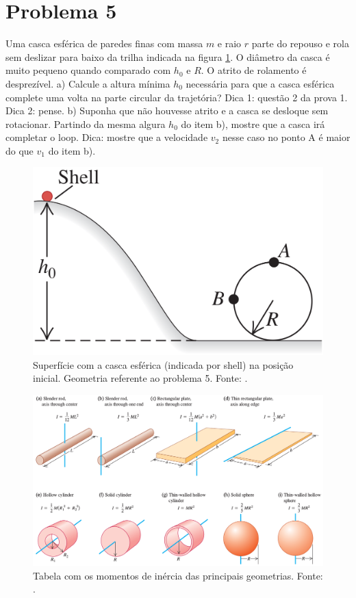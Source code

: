 \documentclass[a4paper, 11pt]{article}
\begin{document}
\section*{Problema 5}
Uma casca esférica de paredes finas com massa $m$ e raio $r$ parte do repouso e rola sem deslizar para baixo da trilha indicada na figura \ref{casca_prob}. O diâmetro da casca é muito pequeno quando comparado com $h_0$ e $R$. O atrito de rolamento é desprezível. a) Calcule a altura mínima $h_0$ necessária para que a casca esférica complete uma volta na parte circular da trajetória? Dica 1: questão 2 da prova 1. Dica 2: pense. b) Suponha que não houvesse atrito e a casca se desloque sem rotacionar. Partindo da mesma algura $h_0$ do item b), mostre que a casca irá completar o loop. Dica: mostre que a velocidade $v_2$ nesse caso no ponto A é maior do que $v_1$ do item b).


\begin{figure}
\centering
\includegraphics[width=2.5 in]{figuras/casca_prob.png}
\caption{Superfície com a casca esférica (indicada por shell) na posição inicial. Geometria referente ao problema 5. Fonte: \cite{Young2004}.}
\label{casca_prob}
\end{figure}



\begin{figure}
\centering
\includegraphics[width=6.0 in]{figuras/tabela_mom_inercia.png}
\caption{Tabela com os momentos de inércia das principais geometrias. Fonte: \cite{Young2004}.}
\label{tabela_mom_inercia}
\end{figure}
\end{document}
